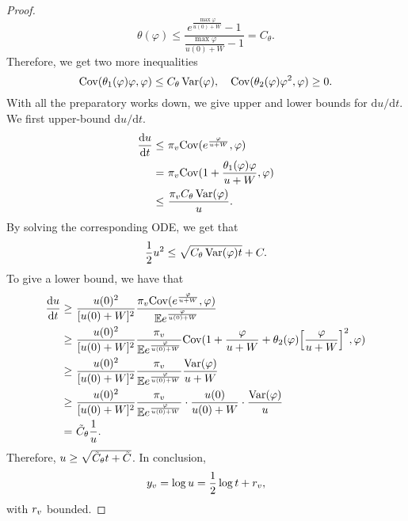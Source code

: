 \begin{proof}
\[
\theta(\varphi) \leq \frac{e^{\frac{\max \varphi}{u(0)+W}}-1}{\frac{\max \varphi}{u(0)+W}-1} = C_\theta.
\]
Therefore, we get two more inequalities
\[
\mathrm{Cov}(\theta_1(\varphi)\varphi,\varphi)\leq C_\theta \operatorname{Var}(\varphi),\quad \mathrm{Cov}(\theta_2(\varphi)\varphi^2,\varphi)\geq 0.
\]
With all the preparatory works down, we give upper and lower bounds for $\mathrm{d}u/\mathrm{d}t$.
We first upper-bound $\mathrm{d}u/\mathrm{d}t$. 
\begin{align*}
\frac{\mathrm{d}u}{\mathrm{d}t} \leq &~ \pi_v \mathrm{Cov}(e^{\frac{\varphi}{u+W}}, \varphi)\\
= &~ \pi_v\mathrm{Cov}(1 + \frac{\theta_1(\varphi)\varphi}{u+W}, \varphi)\\
\leq &~ \frac{\pi_v C_\theta \operatorname{Var}(\varphi)}{u}.
\end{align*}
By solving the corresponding ODE, we get that
\begin{align*}
\frac{1}{2} u^2 \leq \sqrt{C_\theta \operatorname{Var}(\varphi) t} + C.
\end{align*}
To give a lower bound, we have that
\begin{align*}
\frac{\mathrm{d}u}{\mathrm{d}t} \geq &~ \frac{u(0)^2}{[u(0)+W]^2}\frac{\pi_v \mathrm{Cov}(e^{\frac{\varphi}{u+W}},\varphi)}{\mathbb{E} e^{\frac{\varphi}{u(0)+W}}} \\
\geq &~ \frac{u(0)^2}{[u(0)+W]^2}\frac{\pi_v}{\mathbb{E} e^{\frac{\varphi}{u(0)+W}}} \mathrm{Cov}(1+\frac{\varphi}{u+W}+\theta_2(\varphi) \Big[\frac{\varphi}{u+W}\Big]^2,\varphi)\\
\geq &~ \frac{u(0)^2}{[u(0)+W]^2}\frac{\pi_v}{\mathbb{E} e^{\frac{\varphi}{u(0)+W}}} \frac{\operatorname{Var}(\varphi)}{u+W}\\
\geq &~ \frac{u(0)^2}{[u(0)+W]^2}\frac{\pi_v}{\mathbb{E} e^{\frac{\varphi}{u(0)+W}}} \cdot \frac{u(0)}{u(0)+W} \cdot \frac{\operatorname{Var}(\varphi)}{u}\\
= &~ \Tilde{C}_\theta \frac{1}{u}.
\end{align*}
Therefore, $u \geq \sqrt{\Tilde{C}_\theta t + \Tilde{C}}$. In conclusion, 
\[
y_{v} = \log u = \frac{1}{2}\log t + r_{v},
\]
with $r_{v}$ bounded.
\end{proof}
